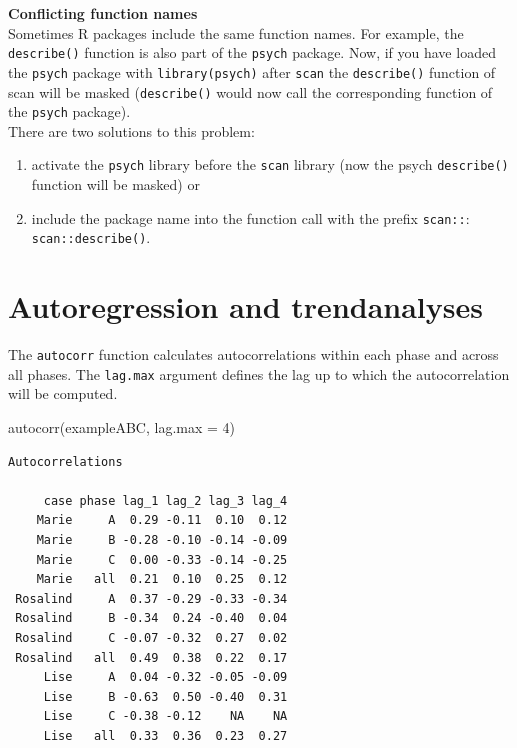 \documentclass[
]{book}
\newenvironment{Shaded}{\begin{snugshade}}{\end{snugshade}}
\newcommand{\AttributeTok}[1]{\textcolor[rgb]{0.77,0.63,0.00}{#1}}
\newcommand{\DecValTok}[1]{\textcolor[rgb]{0.00,0.00,0.81}{#1}}
\newcommand{\FunctionTok}[1]{\textcolor[rgb]{0.00,0.00,0.00}{#1}}
\newcommand{\NormalTok}[1]{#1}
\providecommand{\tightlist}{%
  \setlength{\itemsep}{0pt}\setlength{\parskip}{0pt}}
\begin{document}
\begin{rmdnote}
\textbf{Conflicting function names}\\
Sometimes R packages include the same function names. For example, the
\texttt{describe()} function is also part of the \texttt{psych} package.
Now, if you have loaded the \texttt{psych} package with
\texttt{library(psych)} after \texttt{scan} the \texttt{describe()}
function of scan will be masked (\texttt{describe()} would now call the
corresponding function of the \texttt{psych} package).\\
There are two solutions to this problem:

\begin{enumerate}
\def\labelenumi{\arabic{enumi}.}
\tightlist
\item
  activate the \texttt{psych} library before the \texttt{scan} library
  (now the psych \texttt{describe()} function will be masked) or
\item
  include the package name into the function call with the prefix
  \texttt{scan::}: \texttt{scan::describe()}.
\end{enumerate}
\end{rmdnote}

\hypertarget{autoregression-and-trendanalyses}{%
\section{Autoregression and trendanalyses}\label{autoregression-and-trendanalyses}}

The \texttt{autocorr} function calculates autocorrelations within each phase and across all phases. The \texttt{lag.max} argument defines the lag up to which the autocorrelation will be computed.

\begin{Shaded}
\begin{Highlighting}[]
\FunctionTok{autocorr}\NormalTok{(exampleABC, }\AttributeTok{lag.max =} \DecValTok{4}\NormalTok{)}
\end{Highlighting}
\end{Shaded}

\begin{verbatim}
Autocorrelations

     case phase lag_1 lag_2 lag_3 lag_4
    Marie     A  0.29 -0.11  0.10  0.12
    Marie     B -0.28 -0.10 -0.14 -0.09
    Marie     C  0.00 -0.33 -0.14 -0.25
    Marie   all  0.21  0.10  0.25  0.12
 Rosalind     A  0.37 -0.29 -0.33 -0.34
 Rosalind     B -0.34  0.24 -0.40  0.04
 Rosalind     C -0.07 -0.32  0.27  0.02
 Rosalind   all  0.49  0.38  0.22  0.17
     Lise     A  0.04 -0.32 -0.05 -0.09
     Lise     B -0.63  0.50 -0.40  0.31
     Lise     C -0.38 -0.12    NA    NA
     Lise   all  0.33  0.36  0.23  0.27
\end{verbatim}
\end{document}
